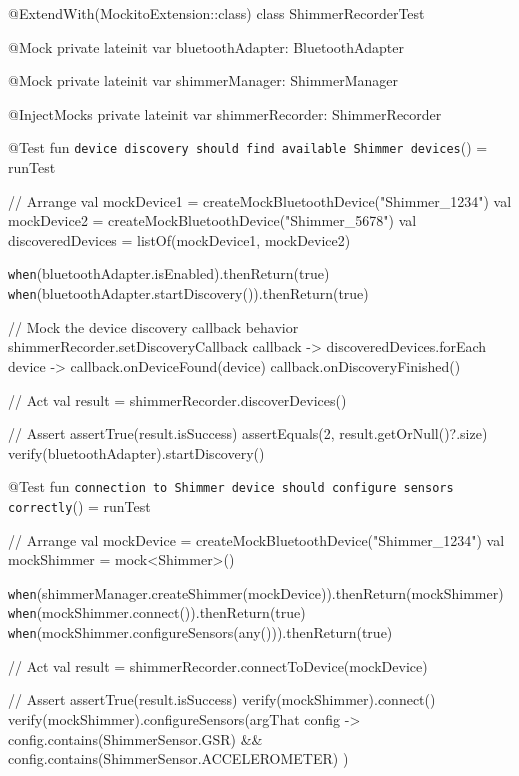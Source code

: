     @ExtendWith(MockitoExtension::class)
    class ShimmerRecorderTest {

        @Mock
        private lateinit var bluetoothAdapter: BluetoothAdapter

        @Mock
        private lateinit var shimmerManager: ShimmerManager

        @InjectMocks
        private lateinit var shimmerRecorder: ShimmerRecorder

        @Test
        fun \texttt{device discovery should find available Shimmer devices}() = runTest {
            // Arrange
            val mockDevice1 = createMockBluetoothDevice("Shimmer_1234")
            val mockDevice2 = createMockBluetoothDevice("Shimmer_5678")
            val discoveredDevices = listOf(mockDevice1, mockDevice2)

            \texttt{when}(bluetoothAdapter.isEnabled).thenReturn(true)
            \texttt{when}(bluetoothAdapter.startDiscovery()).thenReturn(true)

            // Mock the device discovery callback behavior
            shimmerRecorder.setDiscoveryCallback { callback ->
                discoveredDevices.forEach { device ->
                    callback.onDeviceFound(device)
                }
                callback.onDiscoveryFinished()
            }

            // Act
            val result = shimmerRecorder.discoverDevices()

            // Assert
            assertTrue(result.isSuccess)
            assertEquals(2, result.getOrNull()?.size)
            verify(bluetoothAdapter).startDiscovery()
        }

        @Test
        fun \texttt{connection to Shimmer device should configure sensors correctly}() = runTest {
            // Arrange
            val mockDevice = createMockBluetoothDevice("Shimmer_1234")
            val mockShimmer = mock<Shimmer>()

            \texttt{when}(shimmerManager.createShimmer(mockDevice)).thenReturn(mockShimmer)
            \texttt{when}(mockShimmer.connect()).thenReturn(true)
            \texttt{when}(mockShimmer.configureSensors(any())).thenReturn(true)

            // Act
            val result = shimmerRecorder.connectToDevice(mockDevice)

            // Assert
            assertTrue(result.isSuccess)
            verify(mockShimmer).connect()
            verify(mockShimmer).configureSensors(argThat { config ->
                config.contains(ShimmerSensor.GSR) && 
                config.contains(ShimmerSensor.ACCELEROMETER)
            })
        }
    }

